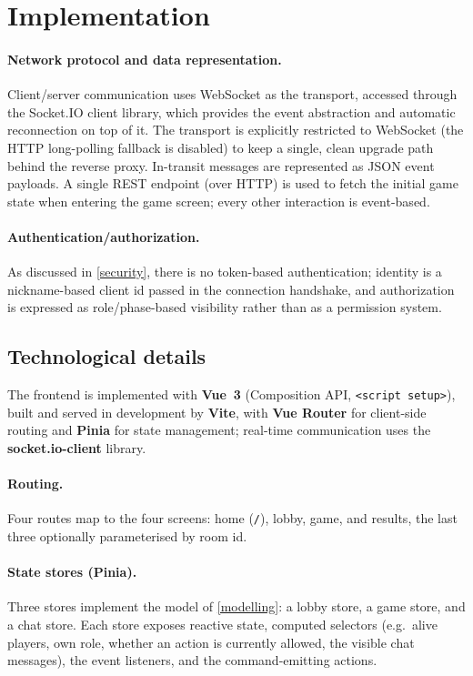 \documentclass{scrartcl}
\begin{document}
\section{Implementation}\label{implementation}

\paragraph{Network protocol and data representation.} Client/server
communication uses WebSocket as the transport, accessed through the
Socket.IO client library, which provides the event abstraction and
automatic reconnection on top of it. The transport is explicitly
restricted to WebSocket (the HTTP long-polling fallback is disabled) to
keep a single, clean upgrade path behind the reverse proxy. In-transit
messages are represented as JSON event payloads. A single REST endpoint
(over HTTP) is used to fetch the initial game state when entering the
game screen; every other interaction is event-based.

\paragraph{Authentication/authorization.} As discussed in
\cref{security}, there is no token-based authentication; identity is a
nickname-based client id passed in the connection handshake, and
authorization is expressed as role/phase-based visibility rather than as
a permission system.

\subsection{Technological details}\label{technological-details}

The frontend is implemented with \textbf{Vue~3} (Composition API,
\texttt{<script setup>}), built and served in development by
\textbf{Vite}, with \textbf{Vue Router} for client-side routing and
\textbf{Pinia} for state management; real-time communication uses the
\textbf{socket.io-client} library.

\paragraph{Routing.} Four routes map to the four screens: home
(\texttt{/}), lobby, game, and results, the last three optionally
parameterised by room id.

\paragraph{State stores (Pinia).} Three stores implement the model of
\cref{modelling}: a lobby store, a game store, and a chat store. Each
store exposes reactive state, computed selectors (e.g.\ alive players,
own role, whether an action is currently allowed, the visible chat
messages), the event listeners, and the command-emitting actions.
\end{document}
